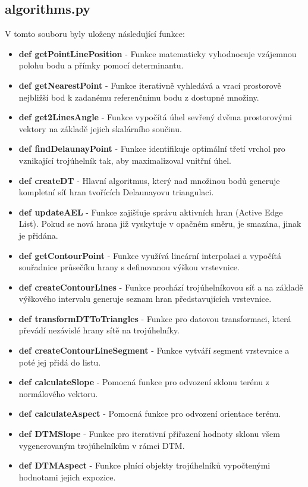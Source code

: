 \documentclass[9pt, a4paper]{article}
\begin{document}
\subsection*{algorithms.py}
\vspace{0.3 cm}
V tomto souboru byly uloženy následující funkce:
\vspace{0.3 cm}

\begin{itemize}
\item \textbf{def getPointLinePosition} - Funkce matematicky vyhodnocuje vzájemnou polohu bodu a přímky pomocí determinantu.
\item \textbf{def getNearestPoint} - Funkce iterativně vyhledává a vrací prostorově nejbližší bod k zadanému referenčnímu bodu z dostupné množiny.
\item \textbf{def get2LinesAngle} - Funkce vypočítá úhel sevřený dvěma prostorovými vektory na základě jejich skalárního součinu.
\item \textbf{def findDelaunayPoint} - Funkce identifikuje optimální třetí vrchol pro vznikající trojúhelník tak, aby maximalizoval vnitřní úhel.
\item \textbf{def createDT} - Hlavní algoritmus, který nad množinou bodů generuje kompletní síť hran tvořících Delaunayovu triangulaci.
\item \textbf{def updateAEL} - Funkce zajišťuje správu aktivních hran (Active Edge List). Pokud se nová hrana již vyskytuje v opačném směru, je smazána, jinak je přidána.
\item \textbf{def getContourPoint} - Funkce využívá lineární interpolaci a vypočítá souřadnice průsečíku hrany s definovanou výškou vrstevnice.
\item \textbf{def createContourLines} - Funkce prochází trojúhelníkovou síť a na základě výškového intervalu generuje seznam hran představujících vrstevnice.
\item \textbf{def transformDTToTriangles} - Funkce pro datovou transformaci, která převádí nezávislé hrany sítě na trojúhelníky.
\item \textbf{def createContourLineSegment} - Funkce vytváří segment vrstevnice a poté jej přidá do listu. 
\item \textbf{def calculateSlope} - Pomocná funkce pro odvození sklonu terénu z normálového vektoru.
\item \textbf{def calculateAspect} - Pomocná funkce pro odvození orientace terénu.
\item \textbf{def DTMSlope} - Funkce pro iterativní přiřazení hodnoty sklonu všem vygenerovaným trojúhelníkům v rámci DTM.
\item \textbf{def DTMAspect} - Funkce plnící objekty trojúhelníků vypočtenými hodnotami jejich expozice.
\end{itemize}
\end{document}
